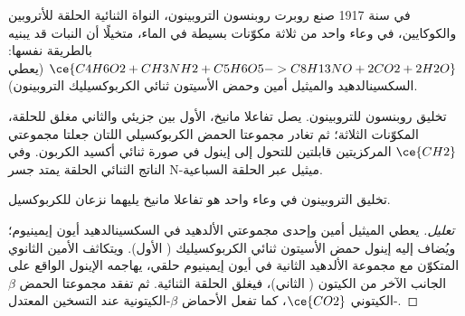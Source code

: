 في سنة 1917 صنع روبرت روبنسون التروبينون، النواة الثنائية الحلقة للأتروبين 
والكوكايين، في وعاء واحد من ثلاثة مكوّنات بسيطة في الماء، متخيلًا أن
النبات قد يبنيه بالطريقة نفسها:
$\ce{C4H6O2 + CH3NH2 + C5H6O5 -> C8H13NO + 2CO2 + 2H2O}$ (يعطي السكسينالدهيد والميثيل أمين 
وحمض الأسيتون ثنائي الكربوكسيليك التروبينون).

\begin{omfigure}

{\small تخليق روبنسون للتروبينون. يصل تفاعلا مانيخ، الأول
بين جزيئي والثاني مغلق للحلقة، المكوّنات الثلاثة؛ ثم
تغادر مجموعتا الحمض الكربوكسيلي اللتان جعلتا مجموعتي $\ce{CH2}$ المركزيتين قابلتين للتحول إلى إينول
في صورة ثنائي أكسيد الكربون. وفي الناتج الثنائي الحلقة يمتد جسر N-ميثيل عبر
الحلقة السباعية.}
\end{omfigure}

\begin{proposition}\label{prop:b3:total-synthesis:tropinone}
تخليق التروبينون في وعاء واحد هو تفاعلا مانيخ يليهما
نزعان للكربوكسيل.
\end{proposition}

\begin{proof}[تعليل]
يعطي الميثيل أمين وإحدى مجموعتي الألدهيد في السكسينالدهيد أيون إيمينيوم؛ ويُضاف إليه
إينول حمض الأسيتون ثنائي الكربوكسيليك ( الأول). ويتكاثف الأمين الثانوي
المتكوّن مع مجموعة الألدهيد الثانية في أيون إيمينيوم
حلقي، يهاجمه الإينول الواقع على الجانب الآخر من الكيتون ( الثاني)،
فيغلق الحلقة الثنائية. ثم تفقد مجموعتا الحمض $\beta$-الكيتوني $\ce{CO2}$، كما تفعل الأحماض $\beta$-الكيتونية
عند التسخين المعتدل.
\end{proof}

